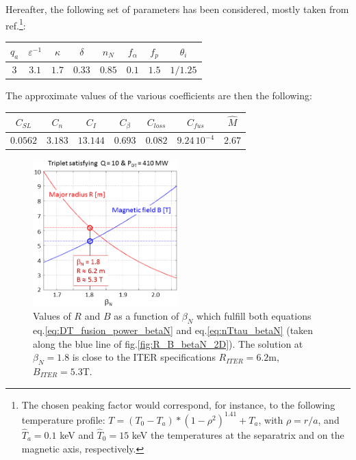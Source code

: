 Hereafter, the following set of parameters has been considered, mostly taken from ref.\cite{Johner2011}\footnote{The chosen peaking factor would correspond, for instance, to the following temperature profile: $T = (T_0-T_a)*(1-\rho^2)^{1.41} + T_a$, with $\rho=r/a$, and $\hat T_a=0.1$ keV and  $\hat T_0=15$ keV the temperatures at the separatrix and on the magnetic axis, respectively.}:
\begin{center}
	\begin{tabular}{c|c|c|c|c|c|c|c}
		\hline
		$q_a$ & $\varepsilon^{-1}$ & $\kappa$ & $\delta$ & $n_N$ & $f_\alpha$ & $f_p$ & $\theta_i$ \\
		\hline
		$3$   & $3.1$ & $1.7$ & $0.33$ & $0.85$ & $0.1$ & $1.5$ & $1/1.25$ \\
		\hline	
	\end{tabular}
\end{center}
The approximate values of the various coefficients are then the following:
\begin{center}
	\begin{tabular}{c|c|c|c|c|c|c}
		\hline
		$C_{SL}$ & $C_n$ & $C_I$ & $C_\beta$ & $C_{loss}$ & $C_{fus}$ & $\hat M$ \\
		\hline
		$0.0562$ & $3.183$ & $13.144$ & $0.693$ & $0.082$ & $9.24\,10^{-4}$ & $2.67$ \\
		\hline	
	\end{tabular}
\end{center}
\bigskip

\begin{figure} 
	\begin{center}
		\includegraphics[width=0.5\textwidth]{figures/Fig_R_B_betaN_solutions.png}
		\caption{Values of $R$ and $B$ as a function of $\beta_N$ which fulfill both equations eq.\ref{eq:DT_fusion_power_betaN} and eq.\ref{eq:nTtau_betaN} (taken along the blue line of fig.\ref{fig:R_B_betaN_2D}). The solution at $\beta_N=1.8$ is close to the ITER specifications $R_{ITER}=6.2$m, $B_{ITER}=5.3$T.}
		\label{fig:solutions_betaN}
	\end{center}
\end{figure}

